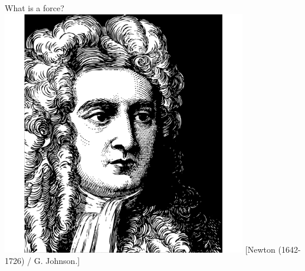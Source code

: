 \begin{frame}
\begin{ThreeCols}{What is a force?}{
    \includegraphics[width=0.8\textwidth]{Figures/Gravity/Exported/Newton_PD_GJohnson.png} \centering \tiny [Newton (1642-1726) / G. Johnson.]}
\end{ThreeCols}
\end{frame}

